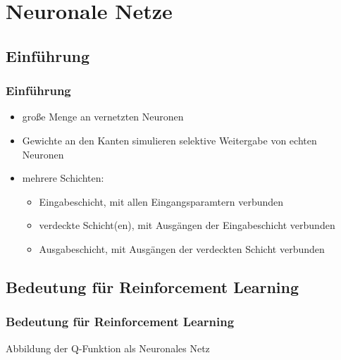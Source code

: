 \section{Neuronale Netze}
	\subsection{Einführung}
		\begin{frame}
			\frametitle{Einführung}

			\begin{itemize}
		      \item große Menge an vernetzten Neuronen
		      \item Gewichte an den Kanten simulieren selektive Weitergabe von echten
		      Neuronen
		      \item mehrere Schichten:
		      	\begin{itemize}
		            \item Eingabeschicht, mit allen Eingangsparamtern verbunden
		            \item verdeckte Schicht(en), mit Ausgängen der Eingabeschicht verbunden
		            \item Ausgabeschicht, mit Ausgängen der verdeckten Schicht verbunden
		          \end{itemize}
		    \end{itemize}
		\end{frame}

	\subsection{Bedeutung für Reinforcement Learning}

		\begin{frame}
	    \frametitle{Bedeutung für Reinforcement Learning}
	    Abbildung der Q-Funktion als Neuronales Netz
		  \begin{center}
		  \end{center}
	    \end{frame}